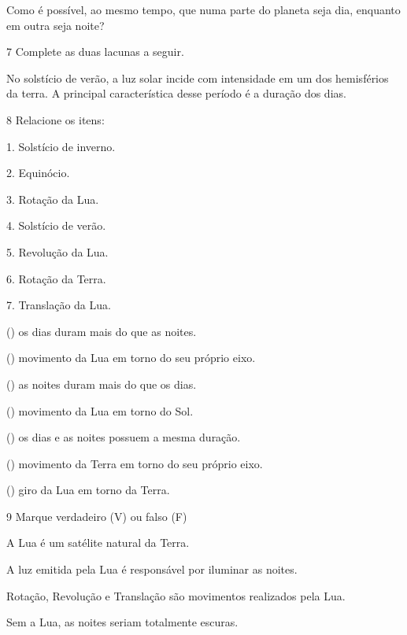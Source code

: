 Como é possível, ao mesmo tempo, que numa parte do planeta seja dia,
enquanto em outra seja noite?


\num{7} Complete as duas lacunas a seguir.

No solstício de verão, a luz solar incide com \preencher\preencher
{} intensidade em um dos hemisférios da terra. A principal
característica desse período é a \preencher\preencher {}
duração dos dias.

\num{8} Relacione os itens:

\begin{multicols}{1}
1. Solstício de inverno.

2. Equinócio.

3. Rotação da Lua.

4. Solstício de verão.

5. Revolução da Lua.

6. Rotação da Terra.

7. Translação da Lua.

\columnbreak

() os dias duram mais do que as noites.

() movimento da Lua em torno do seu próprio eixo.

() as noites duram mais do que os dias.

() movimento da Lua em torno do Sol.

() os dias e as noites possuem a mesma duração.

() movimento da Terra em torno do seu próprio eixo.

() giro da Lua em torno da Terra.
\end{multicols}

\num{9} Marque verdadeiro (V) ou falso (F)

\begin{boxlist}
 A Lua é um satélite natural da Terra.

 A luz emitida pela Lua é responsável por iluminar as noites.

 Rotação, Revolução e Translação são movimentos realizados pela Lua.

 Sem a Lua, as noites seriam totalmente escuras.
\end{boxlist}

